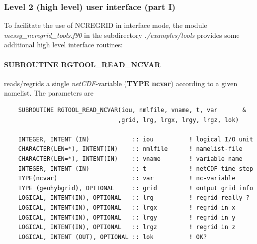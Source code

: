\documentclass[12pt, a4paper]{article}
\begin{document}
\subsubsection{Level 2 (high level) user interface (part I)}
\label{sec:level2_1}
To facilitate the use of NCREGRID in interface mode, the module\\
{\it messy\_ncregrid\_tools.f90} in the
subdirectory {\it ./examples/tools} provides some additional high level
interface routines:

\paragraph{\bf SUBROUTINE RGTOOL\_READ\_NCVAR} reads/regrids a single
{\it netCDF}-variable ({\bf TYPE ncvar}) according to a given namelist.
The parameters are
\begin{verbatim}
    SUBROUTINE RGTOOL_READ_NCVAR(iou, nmlfile, vname, t, var       &
                                ,grid, lrg, lrgx, lrgy, lrgz, lok)

    INTEGER, INTENT (IN)            :: iou          ! logical I/O unit
    CHARACTER(LEN=*), INTENT(IN)    :: nmlfile      ! namelist-file
    CHARACTER(LEN=*), INTENT(IN)    :: vname        ! variable name
    INTEGER, INTENT (IN)            :: t            ! netCDF time step
    TYPE(ncvar)                     :: var          ! nc-variable
    TYPE (geohybgrid), OPTIONAL     :: grid         ! output grid info
    LOGICAL, INTENT(IN), OPTIONAL   :: lrg          ! regrid really ?
    LOGICAL, INTENT(IN), OPTIONAL   :: lrgx         ! regrid in x
    LOGICAL, INTENT(IN), OPTIONAL   :: lrgy         ! regrid in y
    LOGICAL, INTENT(IN), OPTIONAL   :: lrgz         ! regrid in z
    LOGICAL, INTENT (OUT), OPTIONAL :: lok          ! OK?

\end{verbatim}
%
\end{document}

